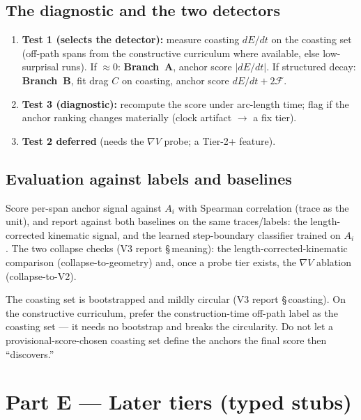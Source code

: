 \documentclass[11pt]{article}
\begin{document}
\subsection{The diagnostic and the two detectors}
\label{sec:t1-detect}
\begin{enumerate}[leftmargin=1.4em,itemsep=1pt]
\item \textbf{Test 1 (selects the detector):} measure coasting $dE/dt$ on the
coasting set (off-path spans from the constructive curriculum where available,
else low-surprisal runs). If $\approx 0$: \textbf{Branch~A}, anchor score
$|dE/dt|$. If structured decay: \textbf{Branch~B}, fit drag $C$ on coasting,
anchor score $dE/dt + 2\mathcal F$.
\item \textbf{Test 3 (diagnostic):} recompute the score under arc-length time;
flag if the anchor ranking changes materially (clock artifact $\to$ a fix tier).
\item \textbf{Test 2 deferred} (needs the $\nabla V$ probe; a Tier-2+ feature).
\end{enumerate}

\subsection{Evaluation against labels and baselines}
\label{sec:t1-eval}
Score per-span anchor signal against $A_i$ with Spearman correlation (trace as the
unit), and report against both baselines on the same traces/labels: the
length-corrected kinematic signal, and the learned step-boundary classifier
trained on $A_i$. The two collapse checks (V3 report \S\,meaning): the
length-corrected-kinematic comparison (collapse-to-geometry) and, once a probe tier
exists, the $\nabla V$ ablation (collapse-to-V2).

\begin{honest}
The coasting set is bootstrapped and mildly circular (V3 report \S\,coasting). On
the constructive curriculum, prefer the construction-time off-path label as the
coasting set --- it needs no bootstrap and breaks the circularity. Do not let a
provisional-score-chosen coasting set define the anchors the final score then
``discovers.''
\end{honest}

\section{Part E --- Later tiers (typed stubs)}
\label{sec:stubs}
\end{document}
